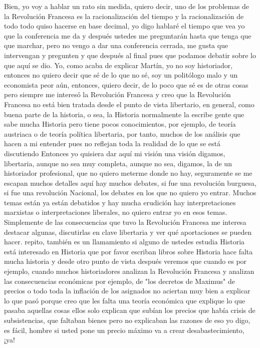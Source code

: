 Bien, yo voy a hablar un rato sin medida, quiero decir, uno de los problemas de la Revolución Francesa es la racionalización del tiempo y la racionalización de todo todo quiso hacerse en base decimal, yo digo hablaré el tiempo que vea yo que la conferencia me da y después ustedes me preguntarán hasta que tenga que que marchar, pero no vengo a dar una conferencia cerrada, me gusta que intervengan y pregunten y que después al final pues que podamos debatir sobre lo que aquí se dio. Yo, como acaba de explicar Martín, yo no soy historiador, entonces no quiero decir que sé de lo que no sé, soy un politólogo malo y un economista peor aún, entonces, quiero decir, de lo poco que sé es de otras cosas pero siempre me interesó la Revolución Francesa y creo que la Revolución Francesa no está bien tratada desde el punto de vista libertario, en general, como buena parte de la historia, o sea, la Historia normalmente la escribe gente que sabe mucha Historia pero tiene pocos conocimientos, por ejemplo, de teoría austriaca o de teoría política libertaria, por tanto, muchos de los análisis que hacen a mi entender pues no reflejan toda la realidad de lo que se está discutiendo Entonces yo quisiera dar aquí mi visión una visión digamos, libertaria, aunque no sea muy completa, aunque no sea, digamos, la de un historiador profesional, que no quiero meterme donde no hay, seguramente se me escapan muchos detalles aquí hay muchos debates, si fue una revolución burguesa, si fue una revolución Nacional, los debates en los que no quiero yo entrar. Muchos temas están ya están debatidos y hay mucha erudición hay interpretaciones marxistas o interpretaciones liberales, no quiero entrar yo en esos temas. Simplemente de las consecuencias que tuvo la Revolución Francesa me interesa destacar algunas, discutirlas en clave libertaria y ver qué aportaciones se pueden hacer.
repito, también es un llamamiento si alguno de ustedes estudia Historia está interesado en Historia que por favor escriban libros sobre Historia
hace falta mucha historia y desde otro punto de vista después veremos que cuando es
por ejemplo, cuando muchos historiadores analizan la Revolución Francesa y analizan las consecuencias económicas
por ejemplo, de "los decretos de Maximus" de precios o todo toda la inflación de los asignados
no aciertan muy bien a explicar lo que pasó porque creo que les falta una teoría económica que explique lo que pasaba
aquellas cosas ellos solo explican que subían los precios que había crisis de subsistencias, que faltaban bienes
pero no explicaban las razones de eso yo digo, es fácil, hombre si usted pone un precio máximo va a crear desabastecimiento, ¡ya!
